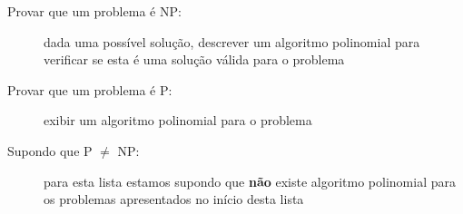 \documentclass[12pt]{article}
\begin{document}
\begin{description}

\item[Provar que um problema é NP:] dada uma possível solução, descrever um algoritmo polinomial para verificar se esta é uma solução válida para o problema

\item[Provar que um problema é P:] exibir um algoritmo polinomial para o problema

\item[Supondo que P $\neq$ NP:] para esta lista estamos supondo que \textbf{não} existe algoritmo polinomial para os problemas apresentados no início desta lista

\end{description}
\end{document}
